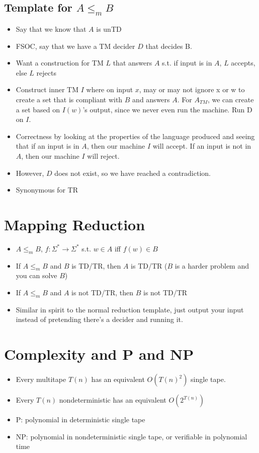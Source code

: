 \documentclass{article}
\begin{document}
\subsection{Template for $A \leq_m B$}
\begin{itemize}
    \item Say that we know that $A$ is unTD
    \item FSOC, say that we have a TM decider $D$ that decides B.
    \item Want a construction for TM $L$ that answers $A$ s.t. if input is in $A$, $L$ accepts, else $L$ rejects
    \item Construct inner TM $I$ where on input $x$, may or may not ignore x or w to create a set that is compliant with $B$ and answers $A$. For $A_{TM}$, we can create a set based on $I(w)$'s output, since we never even run the machine. Run D on $I$.
    \item Correctness by looking at the properties of the language produced and seeing that if an input is in $A$, then our machine $I$ will accept. If an input is not in $A$, then our machine $I$ will reject.
    \item However, $D$ does not exist, so we have reached a contradiction.
    \item Synonymous for TR
\end{itemize}

\section{Mapping Reduction}
\begin{itemize}
    \item $A\leq_m B$, $f:\Sigma^*\to \Sigma^*$ s.t. $w \in A$ iff $f(w) \in B$
    \item If $A\leq_m B$ and $B$ is TD/TR, then $A$ is TD/TR ($B$ is a harder problem and you can solve $B$)
    \item If $A\leq_m B$ and $A$ is not TD/TR, then $B$ is not TD/TR
    \item Similar in spirit to the normal reduction template, just output your input instead of pretending there's a decider and running it.
\end{itemize}
\section{Complexity and P and NP}
\begin{itemize}
    \item Every multitape $T(n)$ has an equivalent $O(T(n)^2)$ single tape.
    \item Every $T(n)$ nondeterministic has an equivalent $O(2^{T(n)})$
    \item P: polynomial in deterministic single tape
    \item NP: polynomial in nondeterministic single tape, or verifiable in polynomial time
\end{itemize}
\end{document}
